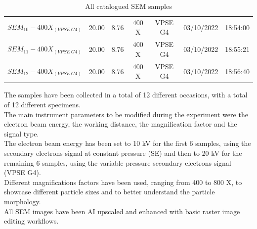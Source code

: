 \documentclass{article}
\begin{document}
\begin{table}[h!]
{\begin{tabular}{@{}ccccccc@{}}
                        \textbf{$SEM_{10}-400X_{(VPSE \ G4)}$} & 20.00                 & 8.76                 & 400 X         & VPSE G4  & 03/10/2022                     & 18:54:00                     \\
                        \textbf{$SEM_{11}-400X_{(VPSE \ G4)}$} & 20.00                 & 8.76                 & 400 X         & VPSE G4  & 03/10/2022                     & 18:55:21                     \\
                        \textbf{$SEM_{12}-400X_{(VPSE \ G4)}$} & 20.00                 & 8.76                 & 400 X         & VPSE G4  & 03/10/2022                     & 18:56:40                     \\ \bottomrule
                    \end{tabular}%
                }
                \caption{All catalogued SEM samples}
                \label{tab:SEM_samples_catalogue}
            \end{table}

            The samples have been collected in a total of 12 different occasions, with a total of 12 different specimens. \\


            The main instrument parameters to be modified during the experiment were the electron beam energy, the working distance, the magnification 
            factor and the signal type.  \\
            The electron beam energy has been set to 10 kV for the first 6 samples, using the secondary electrons signal at constant pressure (SE)
            and then to 20 kV for the remaining 6 samples, using the variable pressure secondary electrons signal (VPSE G4). \\

            Different magnifications factors have been used, ranging from 400 to 800 X, to showcase different particle sizes and to better understand 
            the particle morphology. \\

            All SEM images have been AI upscaled and enhanced with basic raster image editing workflows. \\ 
\end{document}
